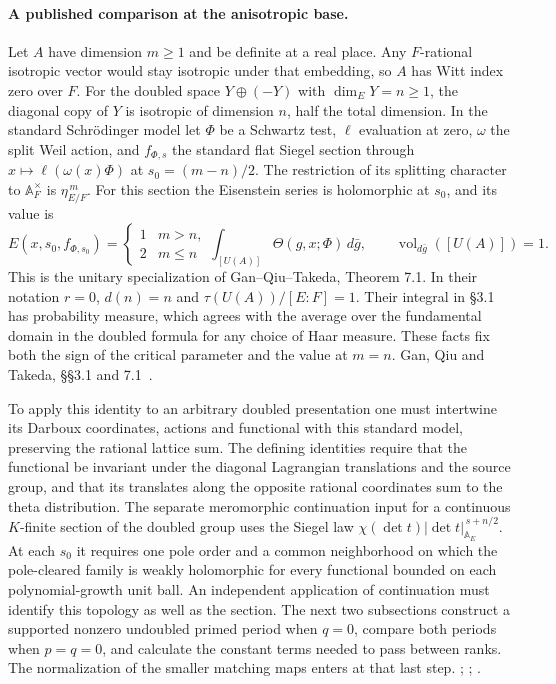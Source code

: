 \paragraph{A published comparison at the anisotropic base.}
Let \(A\) have dimension \(m\ge1\) and be definite at a real place.
Any \(F\)-rational isotropic vector would stay isotropic under that
embedding, so \(A\) has Witt index zero over \(F\). For the doubled
space \(Y\oplus(-Y)\) with \(\dim_EY=n\ge1\), the diagonal copy of
\(Y\) is isotropic of dimension \(n\), half the total dimension.
In the standard Schr\"odinger model let \(\Phi\) be a Schwartz test,
\(\ell\) evaluation at zero, \(\omega\) the split Weil action, and
\(f_{\Phi,s}\) the standard flat Siegel section through
\(x\mapsto\ell(\omega(x)\Phi)\) at \(s_0=(m-n)/2\).
The restriction of its splitting character to \(\mathbb A_F^\times\)
is \(\eta_{E/F}^{\,m}\). For this section the Eisenstein series is
holomorphic at \(s_0\), and its value is
\[
 E(x,s_0,f_{\Phi,s_0})=
 \begin{cases}1&m>n,\\2&m\le n\end{cases}
 \int_{[U(A)]}\Theta(g,x;\Phi)\,d\bar g ,
 \qquad \operatorname{vol}_{d\bar g}([U(A)])=1.
\]
This is the unitary specialization of Gan--Qiu--Takeda, Theorem 7.1.
In their notation \(r=0\), \(d(n)=n\) and
\(\tau(U(A))/[E:F]=1\). Their integral in \S3.1 has probability
measure, which agrees with the average over the fundamental domain in
the doubled formula for any choice of Haar measure. These facts fix
both the sign of the critical parameter and the value at \(m=n\).
Gan, Qiu and Takeda, \S\S3.1 and 7.1~\cite{ganQiuTakeda}.

To apply this identity to an arbitrary doubled presentation one must
intertwine its Darboux coordinates, actions and functional with this
standard model, preserving the rational lattice sum. The defining
identities require that the functional be invariant under the
diagonal Lagrangian translations and the source group, and that its
translates along the opposite rational coordinates sum to the theta
distribution. The separate meromorphic continuation input for a
continuous \(K\)-finite section of the doubled group uses the Siegel
law \(\chi(\det t)|\det t|_{\mathbb A_E}^{\,s+n/2}\).
At each \(s_0\) it requires one pole order and a common neighborhood
on which the pole-cleared family is weakly holomorphic for every
functional bounded on each polynomial-growth unit ball. An independent
application of continuation must identify this topology as well as the
section. The next two subsections construct a supported nonzero
undoubled primed period when \(q=0\), compare both periods when
\(p=q=0\), and calculate the constant terms needed to pass between
ranks. The normalization of the smaller matching maps enters at
that last step.
;
;
.

